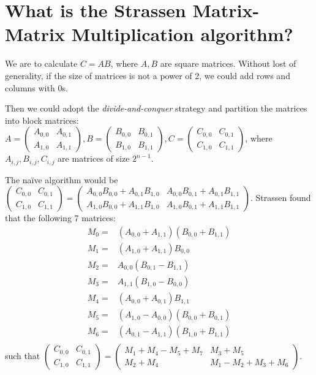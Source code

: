 \documentclass[12pt, a4paper]{article}
\begin{document}

\section{What is the Strassen Matrix-Matrix Multiplication algorithm?}

We are to calculate $C=AB$, where $A,B$ are square matrices. Without lost of generality, if the size of matrices is not a power of 2, we could add rows and columns with 0s.

Then we could adopt the \textit{divide-and-conquer} strategy and partition the matrices into block matrices: $A=\begin{pmatrix}A_{0,0}&A_{0,1}\\A_{1,0}&A_{1,1}\end{pmatrix},B=\begin{pmatrix}B_{0,0}&B_{0,1}\\B_{1,0}&B_{1,1}\end{pmatrix},C=\begin{pmatrix}C_{0,0}&C_{0,1}\\C_{1,0}&C_{1,1}\end{pmatrix}$, where $A_{i,j},B_{i,j},C_{i,j}$ are matrices of size $2^{n-1}$.

The na\"{i}ve algorithm would be $\begin{pmatrix}C_{0,0}&C_{0,1}\\C_{1,0}&C_{1,1}\end{pmatrix}=\begin{pmatrix} A_{0,0}B_{0,0}+A_{0,1}B_{1,0} & A_{0,0}B_{0,1}+A_{0,1}B_{1,1}\\ A_{1,0}B_{0,0}+A_{1,1}B_{1,0} & A_{1,0}B_{0,1}+A_{1,1}B_{1,1} \end{pmatrix}$. Strassen found that the following 7 matrices:
\begin{align*}
M_0=&(A_{0,0}+A_{1,1})(B_{0,0}+B_{1,1})\\
M_1=&(A_{1,0}+A_{1,1})B_{0,0}\\
M_2=&A_{0,0}(B_{0,1}-B_{1,1})\\
M_3=&A_{1,1}(B_{1,0}-B_{0,0})\\
M_4=&(A_{0,0}+A_{0,1})B_{1,1}\\
M_5=&(A_{1,0}-A_{0,0})(B_{0,0}+B_{0,1})\\
M_6=&(A_{0,1}-A_{1,1})(B_{1,0}+B_{1,1})\\
\end{align*}
such that $\begin{pmatrix}C_{0,0}&C_{0,1}\\C_{1,0}&C_{1,1}\end{pmatrix}=\begin{pmatrix} M_1+M_4-M_5+M_7 & M_3+M_5 \\ M_2+M_4 & M_1-M_2+M_3+M_6 \end{pmatrix}$.
\end{document}
